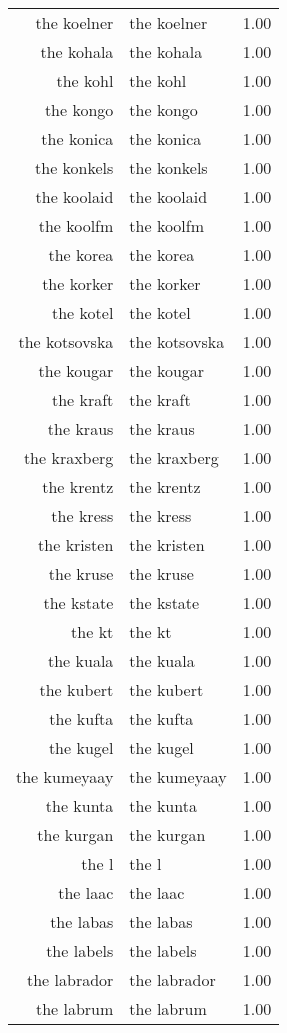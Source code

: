 \begin{table}[ht]
\begin{tabular}{rlr}
  the koelner & the koelner & 1.00 \\ 
  the kohala & the kohala & 1.00 \\ 
  the kohl & the kohl & 1.00 \\ 
  the kongo & the kongo & 1.00 \\ 
  the konica & the konica & 1.00 \\ 
  the konkels & the konkels & 1.00 \\ 
  the koolaid & the koolaid & 1.00 \\ 
  the koolfm & the koolfm & 1.00 \\ 
  the korea & the korea & 1.00 \\ 
  the korker & the korker & 1.00 \\ 
  the kotel & the kotel & 1.00 \\ 
  the kotsovska & the kotsovska & 1.00 \\ 
  the kougar & the kougar & 1.00 \\ 
  the kraft & the kraft & 1.00 \\ 
  the kraus & the kraus & 1.00 \\ 
  the kraxberg & the kraxberg & 1.00 \\ 
  the krentz & the krentz & 1.00 \\ 
  the kress & the kress & 1.00 \\ 
  the kristen & the kristen & 1.00 \\ 
  the kruse & the kruse & 1.00 \\ 
  the kstate & the kstate & 1.00 \\ 
  the kt & the kt & 1.00 \\ 
  the kuala & the kuala & 1.00 \\ 
  the kubert & the kubert & 1.00 \\ 
  the kufta & the kufta & 1.00 \\ 
  the kugel & the kugel & 1.00 \\ 
  the kumeyaay & the kumeyaay & 1.00 \\ 
  the kunta & the kunta & 1.00 \\ 
  the kurgan & the kurgan & 1.00 \\ 
  the l & the l & 1.00 \\ 
  the laac & the laac & 1.00 \\ 
  the labas & the labas & 1.00 \\ 
  the labels & the labels & 1.00 \\ 
  the labrador & the labrador & 1.00 \\ 
  the labrum & the labrum & 1.00 \\ 

\end{tabular}
\end{table}
